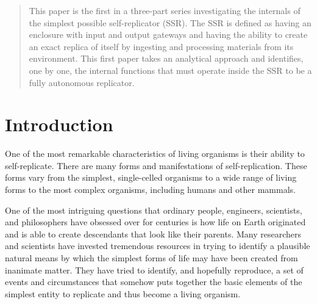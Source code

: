 
\newcommand\migneafigurewide[3]{
	\begin{figure}
		\centering
		\texttt{[image: \#1]}
		\caption{{#2}}
		\label{#3}
	\end{figure}
}
\newcommand\migneafigure[3]{
	\begin{figure}
		\centering
		\texttt{[image: \#1]}
		\caption{{#2}}
		\label{#3}
	\end{figure}
}
\newcommand\mterm[1]{\emph{#1}}
\newcommand\memph[1]{\emph{#1}}


\begin{abstract}
This paper is the first in a three-part series investigating the internals 
of the simplest possible self-replicator (SSR). 
The SSR is defined as having an enclosure with input
and output gateways and having the ability to create an exact replica
of itself by ingesting and processing materials from its
environment. This first paper takes an analytical approach and identifies, one
by one, the internal functions that must operate inside
the SSR to be a fully autonomous replicator.
\end{abstract}

\section{Introduction}

One of the most remarkable characteristics of living organisms is
their ability to self-replicate. There are many forms and
manifestations of self-replication. These forms vary
from the simplest, single-celled organisms to a wide range of
living forms to the most complex organisms, including humans and
other mammals.

One of the most intriguing questions that ordinary people, engineers,
scientists, and philosophers have obsessed over for centuries is how life on Earth
originated and is able
to create
descendants that look like their parents.
Many researchers and scientists
have invested tremendous resources in trying to identify a plausible
natural means by which the simplest forms of life may have been created
from inanimate matter. They have tried to identify, and hopefully
reproduce, a set of events and circumstances that somehow puts
together the basic elements of the simplest entity 
to replicate and thus become a living organism.

